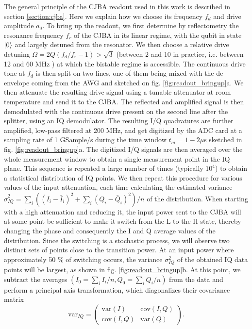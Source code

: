 The general principle of the CJBA readout used in this work is described in section \ref{section:cjba}. Here we explain how we choose its frequency $f_d$ and drive amplitude $a_d$. To bring up the readout, we first determine by reflectometry the resonance frequency $f_r$ of the CJBA in its linear regime, with the qubit in state $\left| 0 \right>$ and largely detuned from the resonator. We then choose a relative drive detuning $\Omega=2Q(f_d/f_r-1)>\sqrt{3}$  (between 2 and 10 in practice, i.e. between 12 and 60 MHz ) at which the bistable regime is accessible. The continuous drive tone at $f_d$ is then split on two lines, one of them being mixed with the dc envelope coming from the AWG and sketched on fig. \ref{fig:readout_bringup}a. We then attenuate the resulting drive signal using a tunable attenuator at room temperature and send it to the CJBA. The reflected and amplified signal is then demodulated with the continuous drive present on the second line after the splitter, using an IQ demodulator. The resulting I/Q quadratures are further amplified, low-pass filtered at 200 MHz, and get digitized by the ADC card at a sampling rate of 1 GSample/s during the time window $t_m=1-2\mu$s sketched in fig. \ref{fig:readout_bringup}a. The digitized I/Q signals are then averaged over the whole measurement window to obtain a single measurement point in the IQ plane.  This sequence is repeated a large number of times (typically $10^4$) to obtain a statistical distribution of IQ points. We then repeat this procedure for various values of the input attenuation, each time calculating the estimated variance $\hat{\sigma}_{IQ}^2=\sum\limits_i ((I_i-\bar{I}_i)^2+\sum\limits_i (Q_i-\bar{Q}_i)^2)/n$ of the distribution. When starting with a high attenuation and reducing it, the input power sent to the CJBA will at some point be sufficient to make it switch from the L to the H state, thereby changing the phase and consequently the I and Q average values of the distribution. Since the switching is a stochastic process, we will observe two distinct sets of points close to the transition power. At an input power where approximately 50 \% of switching occurs, the variance $\sigma_{IQ}^2$ of the obtained IQ data points will be largest, as shown in fig. \ref{fig:readout_bringup}b. At this point, we subtract the averages $(I_0=\sum\limits_i I_i / n,Q_0 = \sum\limits_i Q_i/n)$ from the data and perform a principal axis transformation, which diagonalizes their covariance matrix
%
\begin{equation}
\mathrm{var}_{IQ} = \left(\begin{array}{cc}\mathrm{var}(I) & \mathrm{cov}(I,Q) \\ \mathrm{cov}(I,Q) & \mathrm{var}(Q) \end{array}\right).
\end{equation}
%

